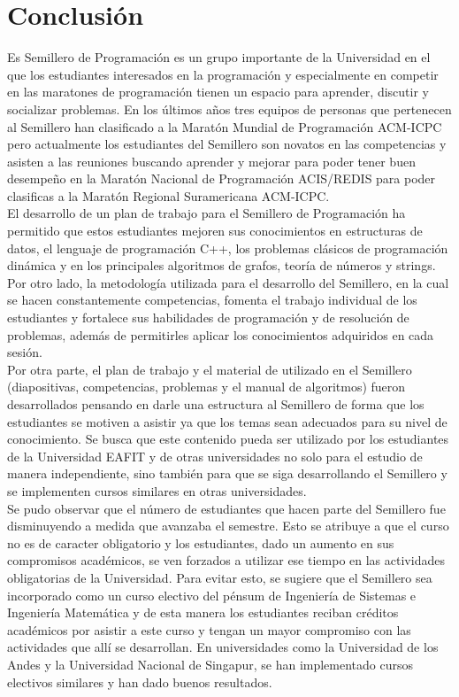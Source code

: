 \documentclass[conference]{IEEEtran}
\begin{document}
\section{Conclusión}
Es Semillero de Programación es un grupo importante de la Universidad en el que los estudiantes interesados en la programación y especialmente en competir en las maratones de programación tienen un espacio para aprender, discutir y socializar problemas. En los últimos años tres equipos de personas que pertenecen al Semillero han clasificado a la Maratón Mundial de Programación ACM-ICPC pero actualmente los estudiantes del Semillero son novatos en las competencias y asisten a las reuniones buscando aprender y mejorar para poder tener buen desempeño en la Maratón Nacional de Programación ACIS/REDIS para poder clasificas a la Maratón Regional Suramericana ACM-ICPC.\\
El desarrollo de un plan de trabajo para el Semillero de Programación ha permitido que estos estudiantes mejoren sus conocimientos en estructuras de datos, el lenguaje de programación C++, los problemas clásicos de programación dinámica y en los principales algoritmos de grafos, teoría de números y strings. Por otro lado, la metodología utilizada para el desarrollo del Semillero, en la cual se hacen constantemente competencias, fomenta el trabajo individual de los estudiantes y fortalece sus habilidades de programación y de resolución de problemas, además de permitirles aplicar los conocimientos adquiridos en cada sesión.\\
Por otra parte, el plan de trabajo y el material de utilizado en el Semillero (diapositivas, competencias, problemas y el manual de algoritmos) fueron desarrollados pensando en darle una estructura al Semillero de forma que los estudiantes se motiven a asistir ya que los temas sean adecuados para su nivel de conocimiento. Se busca que este contenido pueda ser utilizado por los estudiantes de la Universidad EAFIT y de otras universidades no solo para el estudio de manera independiente, sino también para que se siga desarrollando el Semillero y se implementen cursos similares en otras universidades.\\
Se pudo observar que el número de estudiantes que hacen parte del Semillero fue disminuyendo a medida que avanzaba el semestre. Esto se atribuye a que el curso no es de caracter obligatorio y los estudiantes, dado un aumento en sus compromisos académicos, se ven forzados a utilizar ese tiempo en las actividades obligatorias de la Universidad. Para evitar esto, se sugiere que el Semillero sea incorporado como un curso electivo del pénsum de Ingeniería de Sistemas e Ingeniería Matemática y de esta manera los estudiantes reciban créditos académicos por asistir a este curso y tengan un mayor compromiso con las actividades que allí se desarrollan. En universidades como la Universidad de los Andes y la Universidad Nacional de Singapur, se han implementado cursos electivos similares y han dado buenos resultados.\\
\end{document}
